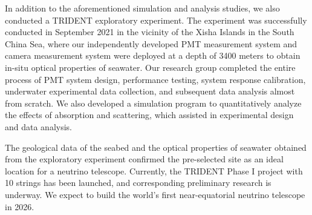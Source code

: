 \begin{eabstract}
In addition to the aforementioned simulation and analysis studies, we also conducted a TRIDENT exploratory experiment. The experiment was successfully conducted in September 2021 in the vicinity of the Xisha Islands in the South China Sea, where our independently developed PMT measurement system and camera measurement system were deployed at a depth of 3400 meters to obtain in-situ optical properties of seawater.
Our research group completed the entire process of PMT system design, performance testing, system response calibration, underwater experimental data collection, and subsequent data analysis almost from scratch. We also developed a simulation program to quantitatively analyze the effects of absorption and scattering, which assisted in experimental design and data analysis.

The geological data of the seabed and the optical properties of seawater obtained from the exploratory experiment confirmed the pre-selected site as an ideal location for a neutrino telescope.
Currently, the TRIDENT Phase I project with 10 strings has been launched, and corresponding preliminary research is underway. We expect to build the world's first near-equatorial neutrino telescope in 2026.

\end{eabstract}

